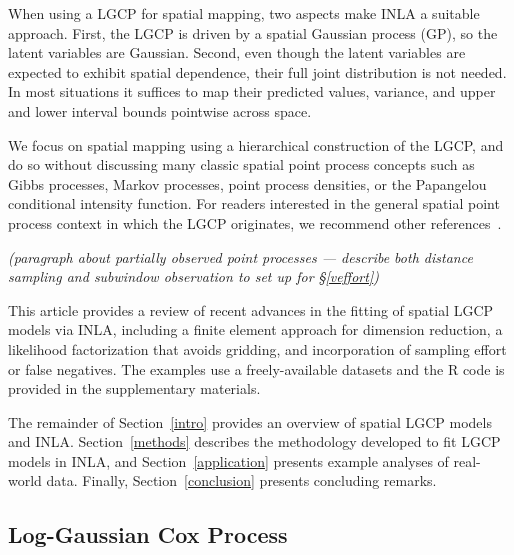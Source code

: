 \documentclass[]{interact}
\begin{document}
When using a LGCP for spatial mapping, two aspects make INLA a suitable
approach. First, the LGCP is driven by a spatial Gaussian process (GP), so the
latent variables are Gaussian. Second, even though the latent variables are
expected to exhibit spatial dependence, their full joint distribution is not
needed. In most situations it suffices to map their predicted values, variance,
and upper and lower interval bounds pointwise across space.

We focus on spatial mapping using a hierarchical construction of the LGCP, and
do so without discussing many classic spatial point process concepts such as
Gibbs processes, Markov processes, point process densities, or the Papangelou
conditional intensity function. For readers interested in the general spatial
point process context in which the LGCP originates, we recommend other
references~\cite{moellerwaagepetersen, digglepoint, cressie}.

{\it (paragraph about partially observed point processes --- describe both
distance sampling and subwindow observation to set up for \S\ref{veffort})}


This article provides a review of recent advances in the fitting of spatial
LGCP models via INLA, including a finite element approach for dimension
reduction, a likelihood factorization that avoids gridding, and incorporation
of sampling effort or false negatives. The examples use a freely-available
datasets and the R code is provided in the supplementary materials.

The remainder of Section~\ref{intro} provides an overview of spatial LGCP
models and INLA. Section~\ref{methods} describes the methodology developed to
fit LGCP models in INLA, and Section~\ref{application} presents example
analyses of real-world data. Finally, Section~\ref{conclusion} presents
concluding remarks.


\subsection{Log-Gaussian Cox Process}
\label{lgcp}

\end{document}

